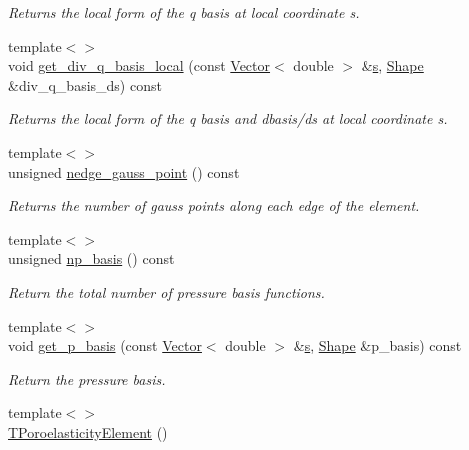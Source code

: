 \begin{DoxyCompactItemize}
\begin{DoxyCompactList}\small\item\em Returns the local form of the q basis at local coordinate s. \end{DoxyCompactList}\item 
{\footnotesize template$<$$>$ }\\void \hyperlink{classoomph_1_1TPoroelasticityElement_a4ab1a8528676f73f652109e16013467a}{get\+\_\+div\+\_\+q\+\_\+basis\+\_\+local} (const \hyperlink{classoomph_1_1Vector}{Vector}$<$ double $>$ \&\hyperlink{cfortran_8h_ab7123126e4885ef647dd9c6e3807a21c}{s}, \hyperlink{classoomph_1_1Shape}{Shape} \&div\+\_\+q\+\_\+basis\+\_\+ds) const
\begin{DoxyCompactList}\small\item\em Returns the local form of the q basis and dbasis/ds at local coordinate s. \end{DoxyCompactList}\item 
{\footnotesize template$<$$>$ }\\unsigned \hyperlink{classoomph_1_1TPoroelasticityElement_a7e718424977eb2ce26c0b5f3703ce89f}{nedge\+\_\+gauss\+\_\+point} () const
\begin{DoxyCompactList}\small\item\em Returns the number of gauss points along each edge of the element. \end{DoxyCompactList}\item 
{\footnotesize template$<$$>$ }\\unsigned \hyperlink{classoomph_1_1TPoroelasticityElement_a3befd892c66029500db46a8410f6e34e}{np\+\_\+basis} () const
\begin{DoxyCompactList}\small\item\em Return the total number of pressure basis functions. \end{DoxyCompactList}\item 
{\footnotesize template$<$$>$ }\\void \hyperlink{classoomph_1_1TPoroelasticityElement_ae5879c618bbfd76e4c720e2d77b39e19}{get\+\_\+p\+\_\+basis} (const \hyperlink{classoomph_1_1Vector}{Vector}$<$ double $>$ \&\hyperlink{cfortran_8h_ab7123126e4885ef647dd9c6e3807a21c}{s}, \hyperlink{classoomph_1_1Shape}{Shape} \&p\+\_\+basis) const
\begin{DoxyCompactList}\small\item\em Return the pressure basis. \end{DoxyCompactList}\item 
{\footnotesize template$<$$>$ }\\\hyperlink{classoomph_1_1TPoroelasticityElement_abbcb62286bbece7beb0ed513db5bfd65}{T\+Poroelasticity\+Element} ()

\end{DoxyCompactItemize}
